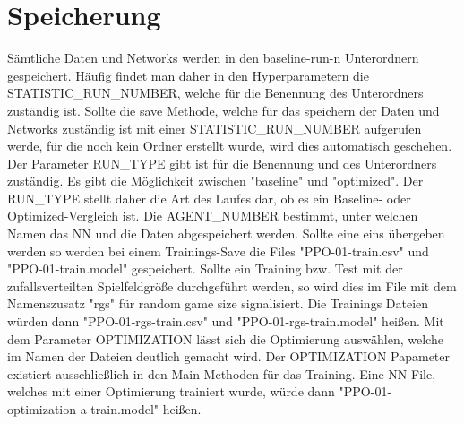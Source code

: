 \section{Speicherung}
Sämtliche Daten und Networks werden in den baseline-run-n Unterordnern gespeichert. Häufig findet man daher in den Hyperparametern die STATISTIC\_RUN\_NUMBER, welche für die Benennung des Unterordners zuständig ist. Sollte die save Methode, welche für das speichern der Daten und Networks zuständig ist mit einer STATISTIC\_RUN\_NUMBER aufgerufen werde, für die noch kein Ordner erstellt wurde, wird dies automatisch geschehen. Der Parameter RUN\_TYPE gibt ist für die Benennung und des Unterordners zuständig. Es gibt die Möglichkeit zwischen "baseline" und "optimized". Der RUN\_TYPE stellt daher die Art des Laufes dar, ob es ein Baseline- oder Optimized-Vergleich ist. Die AGENT\_NUMBER bestimmt, unter welchen Namen das NN und die Daten abgespeichert werden. Sollte eine eins übergeben werden so werden bei einem Trainings-Save die Files "PPO-01-train.csv" und "PPO-01-train.model" gespeichert. Sollte ein Training bzw. Test mit der zufallsverteilten Spielfeldgröße durchgeführt werden, so wird dies im File mit dem Namenszusatz "rgs" für random game size signalisiert. Die Trainings Dateien würden dann "PPO-01-rgs-train.csv" und "PPO-01-rgs-train.model" heißen. Mit dem Parameter OPTIMIZATION lässt sich die Optimierung auswählen, welche im Namen der Dateien deutlich gemacht wird. Der OPTIMIZATION Papameter existiert ausschließlich in den Main-Methoden für das Training. Eine NN File, welches mit einer Optimierung trainiert wurde, würde dann "PPO-01-optimization-a-train.model" heißen.

